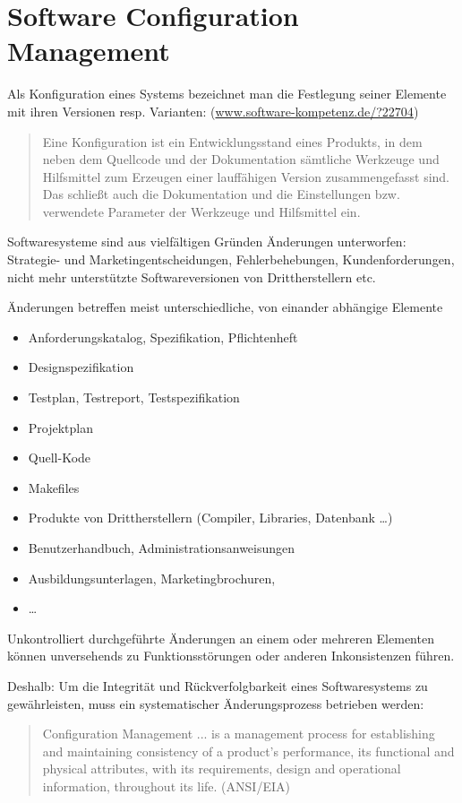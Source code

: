 %
\chapter{Software Configuration Management}
Als Konfiguration eines Systems bezeichnet man die Festlegung seiner
Elemente mit ihren Versionen resp. Varianten:
(\href{http://www.software-kompetenz.de/?22704}
{www.software-kompetenz.de/?22704})
\begin{quote}
Eine Konfiguration ist ein Entwicklungsstand eines Produkts, in dem neben dem
Quellcode und der Dokumentation sämtliche Werkzeuge und Hilfsmittel zum
Erzeugen einer lauffähigen Version zusammengefasst sind. Das schließt auch die
Dokumentation und die Einstellungen bzw. verwendete Parameter der Werkzeuge
und Hilfsmittel ein.
\end{quote}
\newslide
Softwaresysteme sind aus vielfältigen Gründen \"Anderungen unterworfen:
Strategie- und Marketingentscheidungen, Fehlerbehebungen, Kundenforderungen,
nicht mehr unterstützte Softwareversionen von Drittherstellern etc.

\newslide
Änderungen betreffen meist unterschiedliche, von einander abhängige Elemente
\begin{itemize}
\item Anforderungskatalog, Spezifikation, Pflichtenheft
\item Designspezifikation
\item Testplan, Testreport, Testspezifikation
\item Projektplan
\item Quell-Kode
\item Makefiles
\item Produkte von Drittherstellern (Compiler, Libraries, Datenbank \ldots)
\item Benutzerhandbuch, Administrationsanweisungen
\item Ausbildungsunterlagen, Marketingbrochuren,
\item \ldots
\end{itemize}
Unkontrolliert durchgeführte Änderungen an einem oder mehreren Elementen
können unversehends zu Funktionsstörungen oder anderen Inkonsistenzen
führen.

Deshalb: Um die Integrität und Rückverfolgbarkeit eines Softwaresystems zu
gewährleisten, muss ein
systematischer Änderungsprozess betrieben werden:
\begin{quote}
Configuration Management ... is a management process for establishing and
maintaining consistency of a product's performance, its functional and
physical attributes, with its requirements, design and operational
information, throughout its life. (ANSI/EIA)
\end{quote}
\newpage
